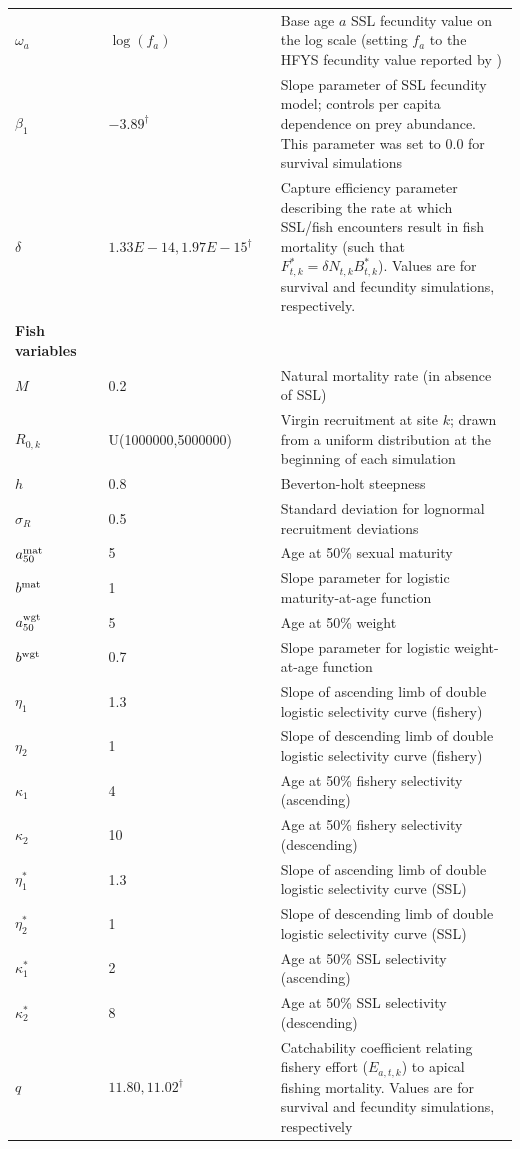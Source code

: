 \documentclass[nonumbib,leqno]{nrc1}
\begin{document}
\begin{table}
\begin{tabular}{p{3cm}lll p{9cm}}
$\omega_a$ & & $\log(f_a)$ & & Base age $a$ SSL fecundity value on the log scale (setting $f_a$ to the HFYS fecundity value reported by \citet{HolmesEtAl2007}) \\
$\beta_1$ & & $-3.89^\dag$ & & Slope parameter of SSL fecundity model; controls per capita dependence
                    on prey abundance.  This parameter was set to 0.0 for survival simulations \\
$\delta$ & & $1.33E-14,1.97E-15^\dag$ & & Capture efficiency parameter describing the rate at which SSL/fish encounters result in fish mortality (such that $F_{t,k}^*=\delta N_{t,k} B_{t,k}^*$).  Values are for survival and fecundity simulations, respectively. \\
\midrule
\multicolumn{1}{l}{\textbf{Fish variables}}  \\
$M$ & & 0.2 & & Natural mortality rate (in absence of SSL) \\ [2pt]
$R_{0,k}$ & & U(1000000,5000000) & & Virgin recruitment at site $k$; drawn from a uniform distribution at the beginning of each simulation \\
$h$ & & 0.8 & & Beverton-holt steepness \\
$\sigma_R$ & & 0.5 & & Standard deviation for lognormal recruitment deviations \\
$a_{50}^{\rm mat}$ & & 5 & & Age at 50\% sexual maturity \\
$b^{\rm mat}$ & & 1 & & Slope parameter for logistic maturity-at-age function \\
$a_{50}^{\rm wgt}$ & & 5 & & Age at 50\% weight \\
$b^{\rm wgt}$ & & 0.7 & & Slope parameter for logistic weight-at-age function \\
$\eta_1$ & & 1.3 & & Slope of ascending limb of double logistic selectivity curve (fishery)\\
$\eta_2$ & & 1 & & Slope of descending limb of double logistic selectivity curve (fishery) \\
$\kappa_1$ & & 4 & & Age at 50\% fishery selectivity (ascending) \\
$\kappa_2$ & & 10 & & Age at 50\% fishery selectivity (descending) \\
$\eta_1^*$ & & 1.3 & & Slope of ascending limb of double logistic selectivity curve (SSL) \\
$\eta_2^*$ & & 1 & & Slope of descending limb of double logistic selectivity curve (SSL) \\
$\kappa_1^*$ & & 2 & & Age at 50\% SSL selectivity (ascending) \\
$\kappa_2^*$ & & 8 & & Age at 50\% SSL selectivity (descending) \\
$ q $ & & $11.80,11.02^\dag$ & & Catchability coefficient relating fishery effort ($E_{a,t,k}$) to apical fishing mortality.  Values are for survival and fecundity simulations, respectively \\
\bottomrule
\end{tabular}
\vspace{4in}
\end{table}
\end{document}
